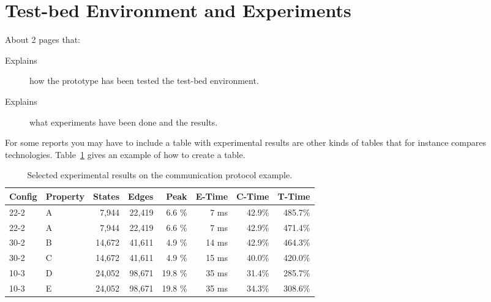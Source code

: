 \section{Test-bed Environment and Experiments}
\label{sec:evaluation}

About 2 pages that:

\begin{description}
\item[Explains] how the prototype has been tested the test-bed environment.

\item[Explains] what experiments have been done and the results.

\end{description}

For some reports you may have to include a table with experimental
results are other kinds of tables that for instance compares
technologies. Table~\ref{tab:results} gives an example of how to create a table.

\begin{table}[H]
\centering
\begin{tabular}{llrrrrrr}
  Config & Property & States & Edges & Peak & E-Time & C-Time & T-Time
  \\ \hline \hline
22-2 & A   &    7,944  &   22,419  &  6.6  \%  &  7 ms & 42.9\% &  485.7\% \\
22-2 & A   &    7,944  &   22,419  &  6.6  \%  &  7 ms & 42.9\% &  471.4\% \\
30-2 & B   &   14,672  &   41,611  &  4.9  \%  & 14 ms & 42.9\% &  464.3\% \\
30-2 & C   &   14,672  &   41,611  &  4.9  \%  & 15 ms & 40.0\% &  420.0\% \\ \hline
10-3 & D   &   24,052  &   98,671  & 19.8  \%  & 35 ms & 31.4\% &  285.7\% \\
10-3 & E   &   24,052  &   98,671  & 19.8  \%  & 35 ms & 34.3\% &  308.6\% \\
\hline \hline
\end{tabular}
\caption{Selected experimental results on the communication protocol example.}
\label{tab:results}
\end{table}
